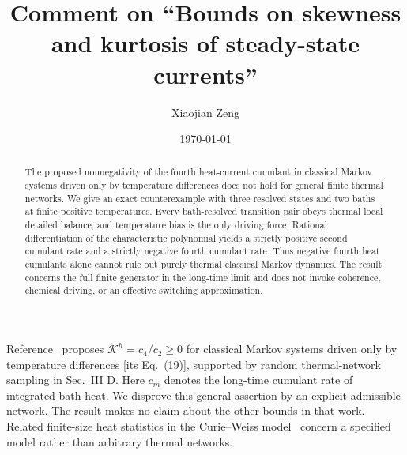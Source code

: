 \documentclass[aps,pre,10pt,onecolumn,notitlepage,longbibliography,amsmath,amssymb]{revtex4-2}
\begin{document}
\title{Comment on ``Bounds on skewness and kurtosis of steady-state currents''}
\author{Xiaojian Zeng}
\date{\today}
\begin{abstract}
The proposed nonnegativity of the fourth heat-current cumulant in classical Markov systems driven only by temperature differences does not hold for general finite thermal networks. We give an exact counterexample with three resolved states and two baths at finite positive temperatures. Every bath-resolved transition pair obeys thermal local detailed balance, and temperature bias is the only driving force. Rational differentiation of the characteristic polynomial yields a strictly positive second cumulant rate and a strictly negative fourth cumulant rate. Thus negative fourth heat cumulants alone cannot rule out purely thermal classical Markov dynamics. The result concerns the full finite generator in the long-time limit and does not invoke coherence, chemical driving, or an effective switching approximation.
\end{abstract}
\maketitle

Reference~\cite{Ptaszynski2022} proposes $\mathcal K^h=c_4/c_2\geq0$ for classical Markov systems driven only by temperature differences [its Eq.~(19)], supported by random thermal-network sampling in Sec.~III D. Here $c_m$ denotes the long-time cumulant rate of integrated bath heat. We disprove this general assertion by an explicit admissible network. The result makes no claim about the other bounds in that work. Related finite-size heat statistics in the Curie--Weiss model~\cite{PtaszynskiEsposito2025} concern a specified model rather than arbitrary thermal networks.
\end{document}
